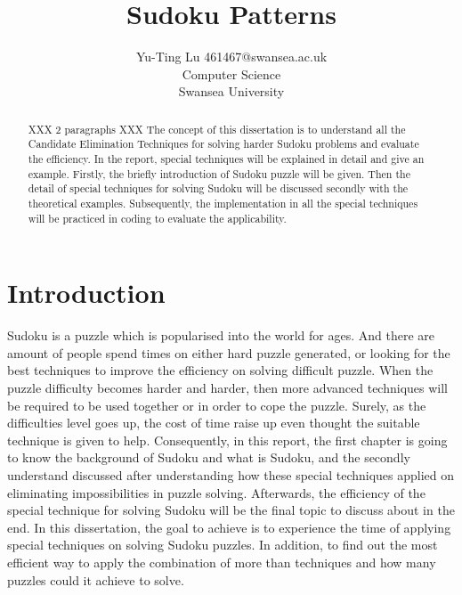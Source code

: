 \documentclass[11pt]{report}
\begin{document}
\title{Sudoku Patterns}
\author{Yu-Ting Lu 461467@swansea.ac.uk\\
  Computer Science\\
  Swansea University\\
 }
\maketitle

\begin{abstract}
  XXX 2 paragraphs XXX
The concept of this dissertation is to understand all the Candidate Elimination Techniques for solving harder Sudoku problems and evaluate the efficiency. In the report, special techniques will be explained in detail and give an example.
Firstly, the briefly introduction of Sudoku puzzle will be given. Then the detail of special techniques for solving Sudoku will be discussed secondly with the theoretical examples.
Subsequently, the implementation in all the special techniques will be practiced in coding to evaluate the applicability.
\end{abstract}


\tableofcontents



\chapter{Introduction}
\label{cha:Introduction}


Sudoku is a puzzle which is popularised into the world for ages. And there are amount of people spend times on either hard puzzle generated, or looking for the best techniques to improve the efficiency on solving difficult puzzle.
When the puzzle difficulty becomes harder and harder, then more advanced techniques will be required to be used together or in order to cope the puzzle. Surely, as the difficulties level goes up, the cost of time raise up even thought the suitable technique is given to help. Consequently, in this report, the first chapter is going to know the background of Sudoku and what is Sudoku, and the secondly understand discussed after understanding how these special techniques applied on eliminating impossibilities in puzzle solving. Afterwards, the efficiency of the special technique for solving Sudoku will be the final topic to discuss about in the end.
In this dissertation, the goal to achieve is to experience the time of applying special techniques on solving Sudoku puzzles. In addition, to find out the most efficient way to apply the combination of more than techniques and how many puzzles could it achieve to solve.
\end{document}
